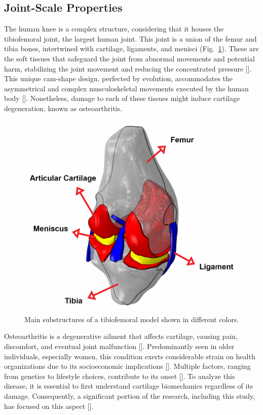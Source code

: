 \subsection{Joint-Scale Properties}
The human knee is a complex structure, considering that it houses the tibiofemoral joint, the largest human joint. This joint is a union of the femur and tibia bones, intertwined with cartilage, ligaments, and menisci (Fig.~\ref{knee}).
These are the soft tissues that safeguard the joint from abnormal movements and potential harm, stabilizing the joint movement and reducing the concentrated pressure [\cite{walker1975,mameri2022}]. This unique cam-shape design, perfected by evolution, accommodates the asymmetrical and complex musculoskeletal movements executed by the human body [\cite{dye1987,goldblatt2003}]. Nonetheless, damage to each of these tissues might induce cartilage degeneration, known as osteoarthritis.
%
\begin{figure}
\centering
\includegraphics[width=0.6\linewidth]{knee.jpg}
\caption{Main substructures of a tibiofemoral model shown in different colors.
\label{knee}}
\end{figure}

Osteoarthritis is a degenerative ailment that affects cartilage, causing pain, discomfort, and eventual joint malfunction [\cite{lespasio2017}]. Predominantly seen in older individuals, especially women, this condition exerts considerable strain on health organizations due to its socioeconomic implications [\cite{Chen2012,gillian2019}]. Multiple factors, ranging from genetics to lifestyle choices, contribute to its onset [\cite{loeser2016,mobasheri2017,astephen2021}]. To analyze this disease, it is essential to first understand cartilage biomechanics regardless of its damage. Consequently, a significant portion of the research, including this study, has focused on this aspect [\cite{kong2022}].

